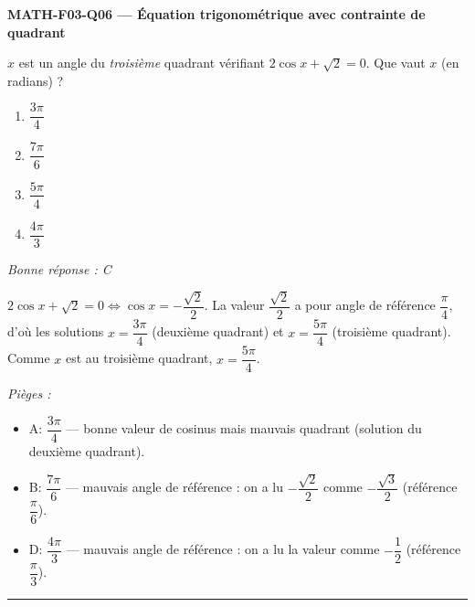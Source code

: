 \documentclass[11pt,a4paper]{article}
\begin{document}
\noindent\textbf{MATH-F03-Q06 --- Équation trigonométrique avec contrainte de quadrant}\par
$x$ est un angle du \emph{troisième} quadrant vérifiant $2\cos x+\sqrt{2}=0$. Que vaut $x$ (en radians) ?
\begin{enumerate}[label=\Alph*)]
\item $\dfrac{3\pi}{4}$
\item $\dfrac{7\pi}{6}$
\item $\dfrac{5\pi}{4}$
\item $\dfrac{4\pi}{3}$
\end{enumerate}
\textit{Bonne réponse : C}\par
$2\cos x+\sqrt2=0\iff\cos x=-\dfrac{\sqrt2}{2}$. La valeur $\dfrac{\sqrt2}{2}$ a pour angle de référence $\dfrac{\pi}{4}$, d'où les solutions $x=\dfrac{3\pi}{4}$ (deuxième quadrant) et $x=\dfrac{5\pi}{4}$ (troisième quadrant). Comme $x$ est au troisième quadrant, $x=\dfrac{5\pi}{4}$.\par
\textit{Pièges :}
\begin{itemize}
\item A: $\dfrac{3\pi}{4}$ --- bonne valeur de cosinus mais mauvais quadrant (solution du deuxième quadrant).
\item B: $\dfrac{7\pi}{6}$ --- mauvais angle de référence : on a lu $-\dfrac{\sqrt2}{2}$ comme $-\dfrac{\sqrt3}{2}$ (référence $\dfrac{\pi}{6}$).
\item D: $\dfrac{4\pi}{3}$ --- mauvais angle de référence : on a lu la valeur comme $-\dfrac12$ (référence $\dfrac{\pi}{3}$).
\end{itemize}
\vspace{8pt}\hrule\vspace{8pt}
\end{document}
